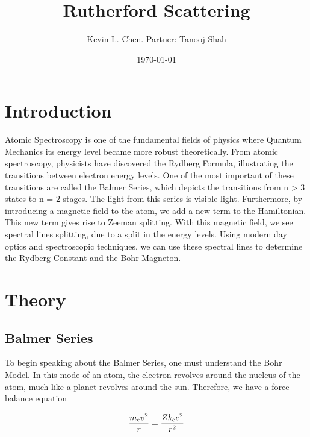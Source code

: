 \title{Rutherford Scattering}
\author         {Kevin L. Chen. Partner: Tanooj Shah}
\date{\today}

\begin{abstract}
\end{abstract}

\maketitle

\section{Introduction}

Atomic Spectroscopy is one of the fundamental fields of physics where Quantum Mechanics its energy level became more robust theoretically. From atomic spectroscopy, physicists have discovered the Rydberg Formula, illustrating the transitions between electron energy levels. One of the most important of these transitions are called the Balmer Series, which depicts the transitions from n > 3 states to n = 2 stages. The light from this series is visible light. Furthermore, by introducing a magnetic field to the atom, we add a new term to the Hamiltonian. This new term gives rise to Zeeman splitting. With this magnetic field, we see spectral lines splitting, due to a split in the energy levels. Using modern day optics and spectroscopic techniques, we can use these spectral lines to determine the Rydberg Constant and the Bohr Magneton. 
\section{Theory}
\subsection{Balmer Series}

To begin speaking about the Balmer Series, one must understand the Bohr Model. In this mode of an atom, the electron revolves around the nucleus of the atom, much like a planet revolves around the sun. Therefore, we have a force balance equation 

\begin{equation}
    {m_\mathrm{e} v^2\over r} = {Zk_\mathrm{e} e^2 \over r^2} 
   \label{Bohr Model}
\end{equation}

